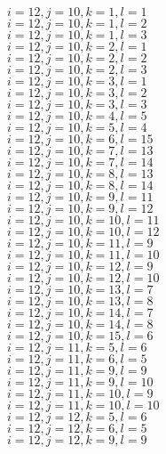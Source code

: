 \documentclass[14pt]{article}
\begin{document}
    $i=12,j=10,k=1,l=1 $ \\ 
    $i=12,j=10,k=1,l=2 $ \\ 
    $i=12,j=10,k=1,l=3 $ \\ 
    $i=12,j=10,k=2,l=1 $ \\ 
    $i=12,j=10,k=2,l=2 $ \\ 
    $i=12,j=10,k=2,l=3 $ \\ 
    $i=12,j=10,k=3,l=1 $ \\ 
    $i=12,j=10,k=3,l=2 $ \\ 
    $i=12,j=10,k=3,l=3 $ \\ 
    $i=12,j=10,k=4,l=5 $ \\ 
    $i=12,j=10,k=5,l=4 $ \\ 
    $i=12,j=10,k=6,l=15 $ \\ 
    $i=12,j=10,k=7,l=13 $ \\ 
    $i=12,j=10,k=7,l=14 $ \\ 
    $i=12,j=10,k=8,l=13 $ \\ 
    $i=12,j=10,k=8,l=14 $ \\ 
    $i=12,j=10,k=9,l=11 $ \\ 
    $i=12,j=10,k=9,l=12 $ \\ 
    $i=12,j=10,k=10,l=11 $ \\ 
    $i=12,j=10,k=10,l=12 $ \\ 
    $i=12,j=10,k=11,l=9 $ \\ 
    $i=12,j=10,k=11,l=10 $ \\ 
    $i=12,j=10,k=12,l=9 $ \\ 
    $i=12,j=10,k=12,l=10 $ \\ 
    $i=12,j=10,k=13,l=7 $ \\ 
    $i=12,j=10,k=13,l=8 $ \\ 
    $i=12,j=10,k=14,l=7 $ \\ 
    $i=12,j=10,k=14,l=8 $ \\ 
    $i=12,j=10,k=15,l=6 $ \\ 
    $i=12,j=11,k=5,l=6 $ \\ 
    $i=12,j=11,k=6,l=5 $ \\ 
    $i=12,j=11,k=9,l=9 $ \\ 
    $i=12,j=11,k=9,l=10 $ \\ 
    $i=12,j=11,k=10,l=9 $ \\ 
    $i=12,j=11,k=10,l=10 $ \\ 
    $i=12,j=12,k=5,l=6 $ \\ 
    $i=12,j=12,k=6,l=5 $ \\ 
    $i=12,j=12,k=9,l=9 $ \\ 
\end{document}
